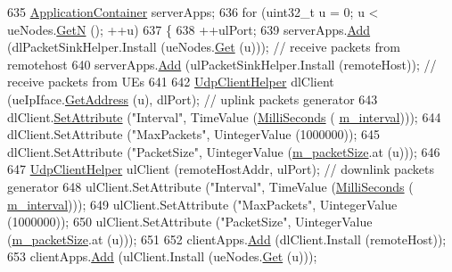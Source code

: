 \begin{DoxyCode}
635   \hyperlink{classns3_1_1ApplicationContainer}{ApplicationContainer} serverApps;
636   \textcolor{keywordflow}{for} (uint32\_t u = 0; u < ueNodes.\hyperlink{classns3_1_1NodeContainer_aed647ac56d0407a7706aba02eb44b951}{GetN} (); ++u)
637     \{
638       ++ulPort;
639       serverApps.\hyperlink{classns3_1_1ApplicationContainer_ad09ab1a1ad5849d518d5f4c262e38152}{Add} (dlPacketSinkHelper.Install (ueNodes.\hyperlink{classns3_1_1NodeContainer_a9ed96e2ecc22e0f5a3d4842eb9bf90bf}{Get} (u))); \textcolor{comment}{// receive packets from
       remotehost}
640       serverApps.\hyperlink{classns3_1_1ApplicationContainer_ad09ab1a1ad5849d518d5f4c262e38152}{Add} (ulPacketSinkHelper.Install (remoteHost));  \textcolor{comment}{// receive packets from UEs}
641 
642       \hyperlink{classns3_1_1UdpClientHelper}{UdpClientHelper} dlClient (ueIpIface.\hyperlink{classns3_1_1Ipv4InterfaceContainer_ae63208dcd222be986822937ee4aa828c}{GetAddress} (u), dlPort); \textcolor{comment}{// uplink
       packets generator}
643       dlClient.\hyperlink{classns3_1_1UdpClientHelper_a8bbae16a28f85ab3f3b5aa4642edfeae}{SetAttribute} (\textcolor{stringliteral}{"Interval"}, TimeValue (\hyperlink{group__timecivil_gaf26127cf4571146b83a92ee18679c7a9}{MilliSeconds} (
      \hyperlink{classLenaFdTbfqFfMacSchedulerTestCase2_a2f29ab8ea196fc6909becc1f291eb129}{m\_interval})));
644       dlClient.SetAttribute (\textcolor{stringliteral}{"MaxPackets"}, UintegerValue (1000000));
645       dlClient.SetAttribute (\textcolor{stringliteral}{"PacketSize"}, UintegerValue (\hyperlink{classLenaFdTbfqFfMacSchedulerTestCase2_ad5516b67243721378cbc5af405181602}{m\_packetSize}.at (u)));
646 
647       \hyperlink{classns3_1_1UdpClientHelper}{UdpClientHelper} ulClient (remoteHostAddr, ulPort);           \textcolor{comment}{// downlink packets
       generator}
648       ulClient.SetAttribute (\textcolor{stringliteral}{"Interval"}, TimeValue (\hyperlink{group__timecivil_gaf26127cf4571146b83a92ee18679c7a9}{MilliSeconds} (
      \hyperlink{classLenaFdTbfqFfMacSchedulerTestCase2_a2f29ab8ea196fc6909becc1f291eb129}{m\_interval})));
649       ulClient.SetAttribute (\textcolor{stringliteral}{"MaxPackets"}, UintegerValue (1000000));
650       ulClient.SetAttribute (\textcolor{stringliteral}{"PacketSize"}, UintegerValue (\hyperlink{classLenaFdTbfqFfMacSchedulerTestCase2_ad5516b67243721378cbc5af405181602}{m\_packetSize}.at (u)));
651 
652       clientApps.\hyperlink{classns3_1_1ApplicationContainer_ad09ab1a1ad5849d518d5f4c262e38152}{Add} (dlClient.Install (remoteHost));
653       clientApps.\hyperlink{classns3_1_1ApplicationContainer_ad09ab1a1ad5849d518d5f4c262e38152}{Add} (ulClient.Install (ueNodes.\hyperlink{classns3_1_1NodeContainer_a9ed96e2ecc22e0f5a3d4842eb9bf90bf}{Get} (u)));

\end{DoxyCode}
